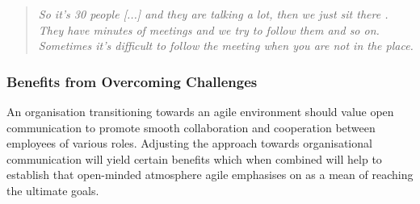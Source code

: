 \begin{description}
      \begin{quote}\itshape So it’s 30 people [...] and they are talking a lot, then we just sit there . They have minutes of meetings and we try to follow them and so on. Sometimes it’s difficult to follow the meeting when you are not in the place.
      \end{quote}

\end{description}

\subsubsection{Benefits from Overcoming Challenges}

An organisation transitioning towards an agile environment should value open communication to promote smooth collaboration and cooperation between employees of various roles. Adjusting the approach towards organisational communication will yield certain benefits which when combined will help to establish that open-minded atmosphere agile emphasises on as a mean of reaching the ultimate goals.

